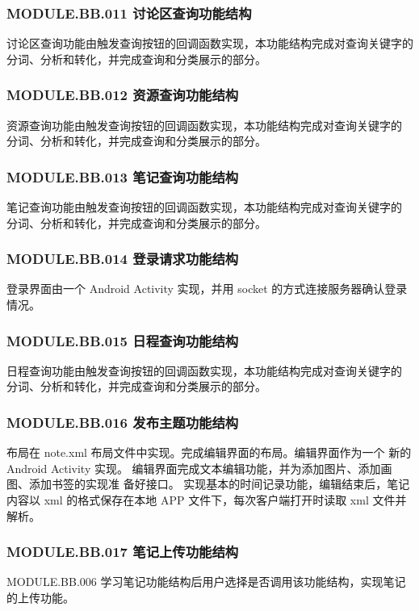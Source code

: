 \subsubsection{MODULE.BB.011    讨论区查询功能结构}
讨论区查询功能由触发查询按钮的回调函数实现，本功能结构完成对查询关键字的 分词、分析和转化，并完成查询和分类展示的部分。

\subsubsection{MODULE.BB.012    资源查询功能结构}
资源查询功能由触发查询按钮的回调函数实现，本功能结构完成对查询关键字的 分词、分析和转化，并完成查询和分类展示的部分。

\subsubsection{MODULE.BB.013    笔记查询功能结构}
笔记查询功能由触发查询按钮的回调函数实现，本功能结构完成对查询关键字的 分词、分析和转化，并完成查询和分类展示的部分。

\subsubsection{MODULE.BB.014    登录请求功能结构}
登录界面由一个 Android Activity 实现，并用 socket 的方式连接服务器确认登录情况。

\subsubsection{MODULE.BB.015    日程查询功能结构}
日程查询功能由触发查询按钮的回调函数实现，本功能结构完成对查询关键字的 分词、分析和转化，并完成查询和分类展示的部分。

\subsubsection{MODULE.BB.016    发布主题功能结构}
布局在 note.xml 布局文件中实现。完成编辑界面的布局。编辑界面作为一个 新的 Android Activity 实现。
编辑界面完成文本编辑功能，并为添加图片、添加画图、添加书签的实现准 备好接口。
实现基本的时间记录功能，编辑结束后，笔记内容以 xml 的格式保存在本地 APP 文件下，每次客户端打开时读取 xml 文件并解析。

\subsubsection{MODULE.BB.017    笔记上传功能结构}
MODULE.BB.006    学习笔记功能结构后用户选择是否调用该功能结构，实现笔记的上传功能。

